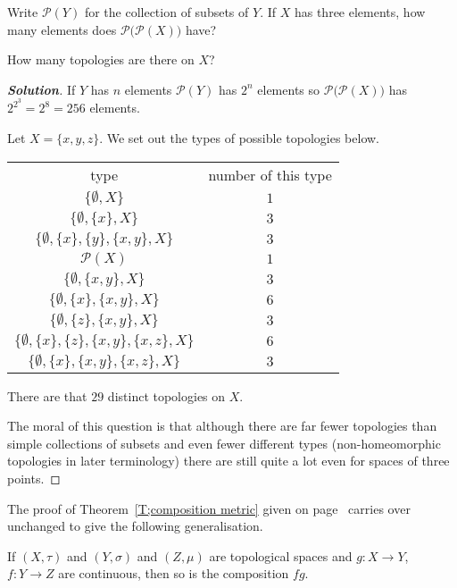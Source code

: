 \begin{theorem}\label{T;silly count}
Write ${\mathcal P}(Y)$ for the collection
of subsets of $Y$. If $X$ has three elements, how many
elements does ${\mathcal P}\big({\mathcal P}(X)\big)$
have?

How many topologies are there on $X$?
\end{theorem}
\begin{proof}[\bf Solution]
If $Y$ has $n$ elements ${\mathcal P}(Y)$ has $2^{n}$
elements so ${\mathcal P}\big({\mathcal P}(X)\big)$
has $2^{2^{3}}=2^{8}=256$ elements.

Let $X=\{x,y,z\}$. We set out the types of possible
topologies below.
\begin{center}
\begin{tabular}{c|c}
type&number of this type\\
$\{\emptyset,X\}$&$1$\\
$\{\emptyset,\{x\},X\}$&$3$\\
$\{\emptyset,\{x\},\{y\},\{x,y\},X\}$&$3$\\
${\mathcal P}(X)$&$1$\\
$\{\emptyset,\{x,y\},X\}$&$3$\\
$\{\emptyset,\{x\},\{x,y\},X\}$&$6$\\
$\{\emptyset,\{z\},\{x,y\},X\}$&$3$\\
$\{\emptyset,\{x\},\{z\},\{x,y\},\{x,z\},X\}$&$6$\\
$\{\emptyset,\{x\},\{x,y\},\{x,z\},X\}$&$3$
\end{tabular}
\end{center}

There are that $29$ distinct topologies on $X$.

The moral of this question is that although there are far
fewer topologies than simple collections of subsets
and even fewer different types (non-homeomorphic
topologies in later terminology) there are still
quite a lot even for spaces of three points.
\end{proof}




The proof of Theorem~\ref{T;composition metric}
given on page~\pageref{New proof composition}
carries over unchanged to give the following generalisation.
\begin{theorem}
If $(X,\tau)$ and $(Y,\sigma)$
and $(Z,\mu)$ are topological spaces and
$g:X\rightarrow Y$, $f:Y\rightarrow Z$
are continuous, then so is the composition $fg$.
\end{theorem}

